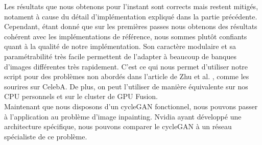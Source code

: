 Les résultats que nous obtenons pour l'instant sont corrects mais restent mitigés, notament à cause du détail d'implémentation expliqué dans la partie précédente. Cependant, étant donné que sur les premières passes nous obtenons des résultats cohérent avec les implémentations de référence, nous sommes plutôt confiants quant à la qualité de notre implémentation. Son caractère modulaire et sa paramétrabilité très facile permettent de l'adapter à beaucoup de banques d'images différentes très rapidement. C'est ce qui nous permet d'utiliser notre script pour des problèmes non abordés dans l'article de Zhu et al. \cite{zhu_unpaired_2018}, comme les sourires sur CelebA. De plus, on peut l'utiliser de manière équivalente sur nos CPU personnels et sur le cluster de GPU Fusion.\\

Maintenant que nous disposons d'un cycleGAN fonctionnel, nous pouvons passer à l'application au problème d'image inpainting. Nvidia ayant développé une architecture spécifique, nous pouvons comparer le cycleGAN à un réseau spécialiste de ce problème.